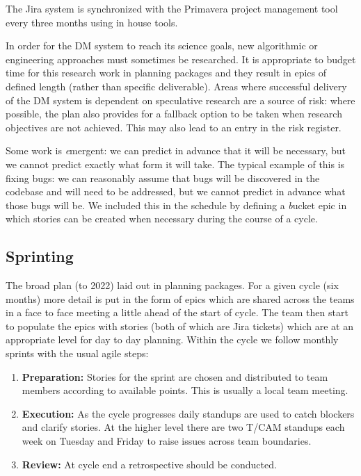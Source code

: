The Jira system is synchronized with the Primavera project management tool every three months using in house tools.

In order for the DM system to reach its science goals, new algorithmic or engineering approaches must sometimes be researched.
It is appropriate to budget time for this research work in planning packages and they result in epics of defined length (rather than specific  deliverable).
Areas where successful delivery of the DM system is dependent on speculative research are a source of risk: where possible, the plan  also provides for a fallback option to be taken when research objectives are not achieved.
This may also lead to an entry in the risk register.


Some work is {\emph emergent}: we can predict in advance that it will be necessary, but we cannot
predict exactly what form it will take. The typical example of this is fixing bugs: we can reasonably
assume that bugs will be discovered in the codebase and will need to be addressed,
but we cannot predict in advance what those bugs will be.
We included this in the schedule by defining a {\emph bucket} epic in which stories can be created
when necessary during the course of a cycle.

\subsection{Sprinting} \label{sec:spront} \label{sec:jira_ticket}
The broad plan (to 2022)  laid out in planning packages.
For a  given  cycle (six months)   more detail is put in the form of epics which  are shared across the teams in a face to face meeting a little ahead of the start of cycle.  The team then start to populate the epics with stories (both of which are Jira tickets)  which are at an appropriate level for day to day planning.
Within the cycle we follow monthly sprints with the usual agile steps:
\begin{enumerate}
\item {\bf Preparation:} Stories for the sprint are chosen and distributed to team members according to available points. This is usually a local team meeting.
\item {\bf Execution:} As the cycle progresses daily standups are used to catch blockers and clarify stories. At the higher level there are two T/CAM standups each week on Tuesday and Friday to raise issues across team boundaries.
\item {\bf Review:} At cycle end a retrospective should be conducted.
\end{enumerate}

